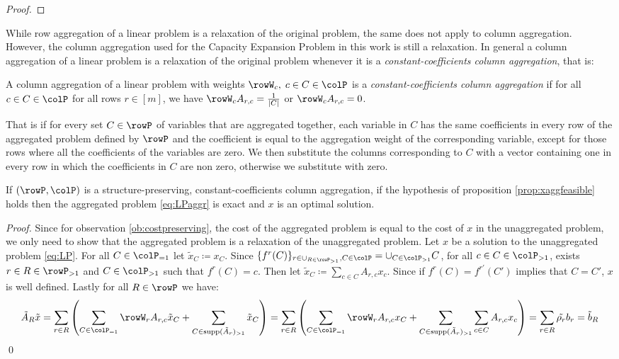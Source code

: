{\begin{proof}
\end{proof}


While row aggregation of a linear problem is a relaxation of the original problem, the same does not apply to column aggregation. However, the column aggregation used for the  Capacity Expansion Problem in this work is still a relaxation. In general a column aggregation of a linear problem is a relaxation of the original problem whenever it is a \emph{constant-coefficients column aggregation}, that is:
\begin{definition}
  A column aggregation  of a linear problem with weights \(\rowW_c,\; c \in C \in \colP \) is a \emph{constant-coefficients column aggregation}  if for all \(c \in C \in \colP\) for all rows \(r \in [m]\), we have \(\rowW_cA_{r,c} = \frac{1}{|C|}\) or  \(\rowW_cA_{r,c} = 0\).  
\end{definition}

That is if for every set \( C \in \rowP \) of variables that are aggregated together, each variable in \( C \) has the same coefficients in every row of the aggregated problem defined by \( \rowP \) and the coefficient is equal to the aggregation weight of the corresponding variable, except for those rows where all the coefficients of the variables are zero.
We then substitute the columns corresponding to \( C \) with a vector containing one in every row in which the coefficients in \(C\) are non zero, otherwise we substitute with zero.

\begin{proposition}
If \((\rowP,\colP)\) is a structure-preserving, constant-coefficients column aggregation,
if the hypothesis of proposition \ref{prop:xaggfeasible} holds then the aggregated problem \eqref{eq:LPaggr} is exact and \(x\) is an optimal solution.
\end{proposition}

\begin{proof}
  Since for observation \ref{ob:costpreserving}, the cost of the aggregated problem is equal to the cost of \(x\) in the unaggregated problem, we only need to show that the aggregated problem is a relaxation of the unaggregated problem.
  Let \(x\) be a solution to the unaggregated problem \eqref{eq:LP}. For all \(C \in \colP_{=1}\) let \(\tilde{x}_C \coloneqq x_C\).
  Since  \(\{f^r(C)\}_{r \in \cup_{R\in \rowP_{>1}}, C \in \colP} = \cup_{C \in \colP_{>1}}C\), for all \(c \in C \in \colP_{>1}\), exists \(r \in R \in \rowP_{>1}\) and \(C \in \colP_{>1}\) such that \(f^r(C) = c\).
  Then let \(\tilde{x}_C \coloneqq \sum_{c \in C}A_{r,c}x_c\). Since if \(f^{r}(C)= f^{r'}(C')\) implies that \(C=C'\), \(x\) is well defined.
  Lastly for all \(R \in \rowP\) we have:
  \[\tilde{A}_R\tilde{x} = \sum_{r \in R} \left( \sum_{C \in \colP_{=1}}\rowW_rA_{r,c}\tilde{x}_C + \sum_{C\in \supp(\tilde{A}_r)_{>1}} \tilde{x}_C \right) = \sum_{r \in R} \left( \sum_{C \in \colP_{=1}}\rowW_rA_{r,c}x_C + \sum_{C\in \supp(\tilde{A}_r)_{>1}} \sum_{c \in C}A_{r,c}x_c \right) = \sum_{r \in R} \tilde{\rho_r} b_r = \tilde{b}_R 
  \]
  \qed
\end{proof}
}

